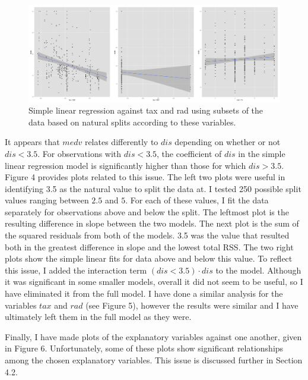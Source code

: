 \documentclass[12pt]{article}
\begin{document}
\begin{figure}[ht!]
\centering
\includegraphics[width=150mm]{taxrad.png}
\caption{Simple linear regression against tax and rad using subsets of the data based on natural splits according to these variables.}
\end{figure}

It appears that $medv$ relates differently to $dis$ depending on whether or not $dis < 3.5$.  For observations with $dis < 3.5$, the coefficient of $dis$ in the simple linear regression model is significantly higher than those for which $dis > 3.5$.  Figure 4 provides plots related to this issue.  The left two plots were useful in identifying 3.5 as the natural value to split the data at.  I tested 250 possible split values ranging between $2.5$ and $5$.  For each of these values, I fit the data separately for observations above and below the split.  The leftmost plot is the resulting difference in slope between the two models.  The next plot is the sum of the squared residuals from both of the models.  3.5 was the value that resulted both in the greatest difference in slope and the lowest total RSS.  The two right plots show the simple linear fits for data above and below this value.  To reflect this issue, I added the interaction term $(dis < 3.5) \cdot dis$ to the model.  Although it was significant in some smaller models, overall it did not seem to be useful, so I have eliminated it from the full model.  I have done a similar analysis for the variables $tax$ and $rad$ (see Figure 5), however the results were similar and I have ultimately left them in the full model as they were.

Finally, I have made plots of the explanatory variables against one another, given in Figure 6.  Unfortunately, some of these plots show significant relationships among the chosen explanatory variables.  This issue is discussed further in Section 4.2.
\end{document}
